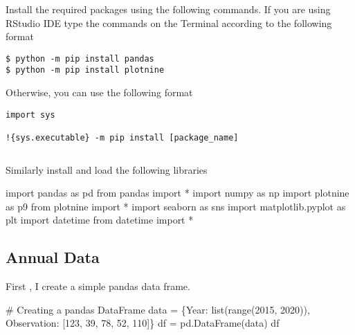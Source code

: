 \documentclass[
  letterpaper,
  DIV=11,
  numbers=noendperiod]{scrreprt}
\newenvironment{Shaded}{\begin{snugshade}}{\end{snugshade}}
\newcommand{\BuiltInTok}[1]{\textcolor[rgb]{0.00,0.23,0.31}{#1}}
\newcommand{\CommentTok}[1]{\textcolor[rgb]{0.37,0.37,0.37}{#1}}
\newcommand{\DecValTok}[1]{\textcolor[rgb]{0.68,0.00,0.00}{#1}}
\newcommand{\ImportTok}[1]{\textcolor[rgb]{0.00,0.46,0.62}{#1}}
\newcommand{\NormalTok}[1]{\textcolor[rgb]{0.00,0.23,0.31}{#1}}
\newcommand{\OperatorTok}[1]{\textcolor[rgb]{0.37,0.37,0.37}{#1}}
\newcommand{\StringTok}[1]{\textcolor[rgb]{0.13,0.47,0.30}{#1}}
\begin{document}
Install the required packages using the following commands. If you are
using RStudio IDE type the commands on the Terminal according to the
following format

\begin{verbatim}
$ python -m pip install pandas
$ python -m pip install plotnine
\end{verbatim}

Otherwise, you can use the following format

\begin{verbatim}
import sys

!{sys.executable} -m pip install [package_name]
\end{verbatim}

\begin{verbatim}
\end{verbatim}

Similarly install and load the following libraries

\begin{Shaded}
\begin{Highlighting}[]
\ImportTok{import}\NormalTok{ pandas }\ImportTok{as}\NormalTok{ pd}
\ImportTok{from}\NormalTok{ pandas }\ImportTok{import} \OperatorTok{*}
\ImportTok{import}\NormalTok{ numpy }\ImportTok{as}\NormalTok{ np}
\ImportTok{import}\NormalTok{ plotnine }\ImportTok{as}\NormalTok{ p9}
\ImportTok{from}\NormalTok{ plotnine }\ImportTok{import} \OperatorTok{*}
\ImportTok{import}\NormalTok{ seaborn }\ImportTok{as}\NormalTok{ sns}
\ImportTok{import}\NormalTok{ matplotlib.pyplot }\ImportTok{as}\NormalTok{ plt}
\ImportTok{import}\NormalTok{ datetime}
\ImportTok{from}\NormalTok{ datetime }\ImportTok{import} \OperatorTok{*}
\end{Highlighting}
\end{Shaded}

\hypertarget{annual-data}{%
\subsection{Annual Data}\label{annual-data}}

First , I create a simple pandas data frame.

\begin{Shaded}
\begin{Highlighting}[]
\CommentTok{\# Creating a pandas DataFrame}
\NormalTok{data }\OperatorTok{=}\NormalTok{ \{}\StringTok{\textquotesingle{}Year\textquotesingle{}}\NormalTok{: }\BuiltInTok{list}\NormalTok{(}\BuiltInTok{range}\NormalTok{(}\DecValTok{2015}\NormalTok{, }\DecValTok{2020}\NormalTok{)),}
        \StringTok{\textquotesingle{}Observation\textquotesingle{}}\NormalTok{: [}\DecValTok{123}\NormalTok{, }\DecValTok{39}\NormalTok{, }\DecValTok{78}\NormalTok{, }\DecValTok{52}\NormalTok{, }\DecValTok{110}\NormalTok{]\}}
\NormalTok{df }\OperatorTok{=}\NormalTok{ pd.DataFrame(data)}
\NormalTok{df}
\end{Highlighting}
\end{Shaded}
\end{document}
